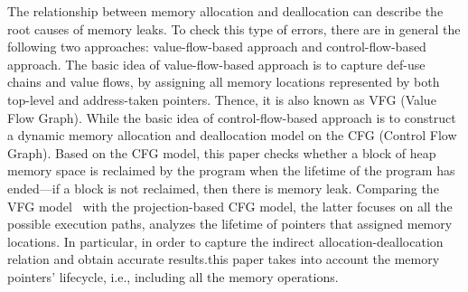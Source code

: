 The relationship between memory allocation and deallocation can describe the root causes of memory leaks. 
To check this type of errors, there are in general the following two approaches: value-flow-based approach and control-flow-based approach. The basic idea of value-flow-based approach is to capture def-use chains and value flows, by assigning all memory locations represented by both top-level and address-taken pointers. Thence, it is also known as VFG (Value Flow Graph)\cite{SYX12}\cite{SLR077}. While the basic idea of control-flow-based approach is to construct a dynamic memory allocation and deallocation model on the CFG (Control Flow Graph). Based on the CFG model, this paper checks whether a block of heap memory space is reclaimed by the program when the lifetime of the program has ended---if a block is not reclaimed, then there is memory leak. Comparing the VFG model~ with the projection-based CFG model, the latter focuses on all the possible execution paths, analyzes the lifetime of pointers that assigned memory locations. %
In particular, in order to capture the indirect allocation-deallocation relation and obtain accurate results.this paper takes into account the memory pointers' lifecycle, i.e., including all the memory operations.
 
